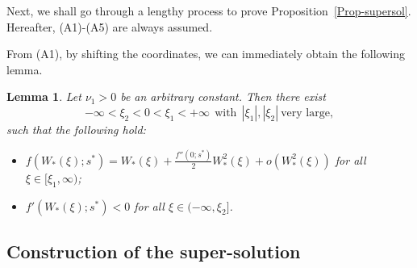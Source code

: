 \documentclass[11pt,a4paper]{article}
\newtheorem{lemma}[theorem]{\textbf{Lemma}}
\numberwithin{equation}{section}
\numberwithin{figure}{section}
\newcommand\dps{\displaystyle}
\newcommand{\red}[1]{{\color{red}#1}}
\newcommand\bea{\begin{eqnarray}}
\newcommand\eea{\end{eqnarray}}
\begin{document}
Next, we shall go through a lengthy process to prove Proposition~\ref{Prop-supersol}.
Hereafter, (A1)-(A5) are always assumed.




From (A1), by shifting the coordinates, we can immediately obtain
the following lemma.

\begin{lemma}\label{lm: divide R to 3 parts}
Let $\nu_{1}>0$ be %
an arbitrary constant. Then there exist
$$-\infty<\xi_2<0<\xi_1<+\infty\ \ \text{with}\ \ |\xi_1|,|\xi_2|\ \text{very large},$$
such that
the following hold:
\begin{itemize}
    \item[(1)]
    $\dps f(W_{*}(\xi);s^*)=W_{*}(\xi)+\frac{f''(0;s^*)}{2}W^2_{*}(\xi)+o(W^2_{*}(\xi))$ for all $\xi\in[\xi_1,\infty)$;
    \item[(2)]  $f'(W_{*}(\xi);s^*)<0$ for all $\xi\in(-\infty,\xi_2]$.
\end{itemize}
\end{lemma}


\subsection{Construction of the super-solution}\label{subsec-2-1}
\end{document}
